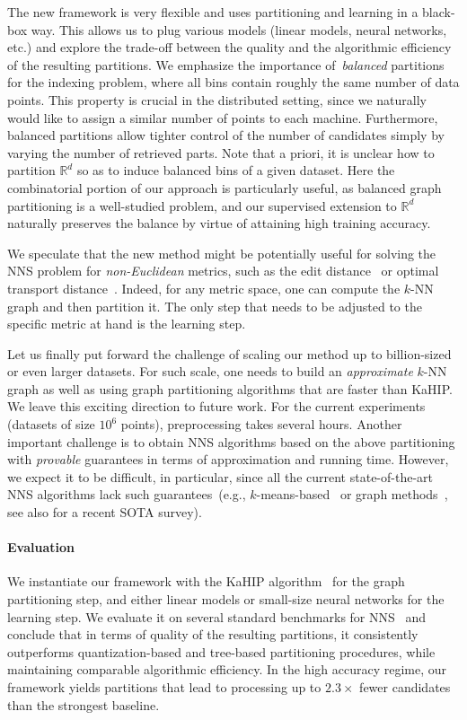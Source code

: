 \documentclass[11pt]{article}
\begin{document}
The new framework is very flexible and uses partitioning and learning in a black-box way. This 
    allows us to plug various models (linear models, neural networks,
    etc.) and explore the trade-off between the quality
    and the algorithmic efficiency of the resulting partitions.
We emphasize the importance of~\emph{balanced} partitions for the indexing problem, where all bins contain roughly the same number of data points.
This property is crucial in the distributed setting, since
we naturally would like to assign a similar number
of points to each machine. 
Furthermore, balanced partitions allow tighter control
of the number of candidates simply by varying the number of retrieved parts.
Note that a priori, it is unclear how to partition $\mathbb{R}^d$ so as to induce balanced bins of a given dataset. Here the combinatorial portion of our approach is particularly useful, as balanced graph partitioning is a well-studied problem, and our supervised extension to $\mathbb{R}^d$ naturally preserves the balance by virtue of attaining high training accuracy.

We speculate that the new method might be potentially useful for solving the NNS problem for \emph{non-Euclidean} metrics, such as the edit distance~\cite{zhang2017embedjoin} or optimal transport distance~\cite{kusner2015word}. Indeed, for any metric space,
one can compute the $k$-NN graph and then partition it. The only step
that needs to be adjusted to the specific metric at hand is the learning step.

Let us finally put forward the challenge of scaling our method up to billion-sized or
even
larger datasets. For such scale, one needs
to build an \emph{approximate} $k$-NN
graph as well as using graph partitioning algorithms
that are faster than KaHIP. We leave
this exciting direction to future work. For the current experiments (datasets of size $10^6$ points), preprocessing takes several hours.
%
Another important challenge is to obtain NNS algorithms
based on the above partitioning with \emph{provable}
guarantees in terms of approximation and running time. However, we expect it to be difficult,
in particular, since all the current state-of-the-art NNS algorithms lack such guarantees~(e.g., $k$-means-based~\cite{jegou2011product} or graph methods~\cite{malkov2018efficient}, see also \cite{aumuller2017ann} for a recent SOTA survey).

\paragraph{Evaluation} We instantiate our framework with the KaHIP algorithm~\cite{sandersschulz2013} for the graph partitioning step, and either linear models or small-size neural networks for the learning step.
We evaluate it on several standard benchmarks for NNS~\cite{aumuller2017ann} and conclude that in terms of quality of the resulting partitions, it consistently outperforms quantization-based and tree-based partitioning
procedures, while maintaining comparable algorithmic efficiency. In the high accuracy regime,
our framework yields partitions that lead to processing up to $2.3\times$ fewer candidates than the strongest baseline.
\end{document}
